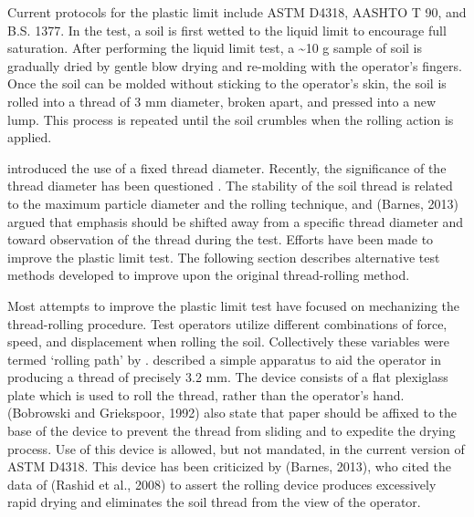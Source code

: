 \documentclass[
]{book}
\begin{document}
Current protocols for the plastic limit include ASTM D4318, AASHTO T 90, and B.S. 1377. In the test, a soil is first wetted to the liquid limit to encourage full saturation. After performing the liquid limit test, a \textasciitilde10 g sample of soil is gradually dried by gentle blow drying and re-molding with the operator's fingers. Once the soil can be molded without sticking to the operator's skin, the soil is rolled into a thread of 3 mm diameter, broken apart, and pressed into a new lump. This process is repeated until the soil crumbles when the rolling action is applied.

\citet{Terzaghi1926} introduced the use of a fixed thread diameter. Recently, the significance of the thread diameter has been questioned \citep{Barnes2013}. The stability of the soil thread is related to the maximum particle diameter and the rolling technique, and (Barnes, 2013) argued that emphasis should be shifted away from a specific thread diameter and toward observation of the thread during the test.
Efforts have been made to improve the plastic limit test. The following section describes alternative test methods developed to improve upon the original thread-rolling method.

Most attempts to improve the plastic limit test have focused on mechanizing the thread-rolling procedure. Test operators utilize different combinations of force, speed, and displacement when rolling the soil. Collectively these variables were termed `rolling path' by \citep{Barnes2013}. \citet{Bobrowski1992} described a simple apparatus to aid the operator in producing a thread of precisely 3.2 mm. The device consists of a flat plexiglass plate which is used to roll the thread, rather than the operator's hand. (Bobrowski and Griekspoor, 1992) also state that paper should be affixed to the base of the device to prevent the thread from sliding and to expedite the drying process. Use of this device is allowed, but not mandated, in the current version of ASTM D4318. This device has been criticized by (Barnes, 2013), who cited the data of (Rashid et al., 2008) to assert the rolling device produces excessively rapid drying and eliminates the soil thread from the view of the operator.
\end{document}
